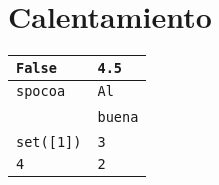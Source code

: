 \section{Calentamiento}
\begin{table}[htbp]
\begin{center}
\begin{tabular}{|l|l|}
\hline
\texttt{False} & \texttt{4.5} \\ \hline
\texttt{spocoa} & \texttt{Al} \\
\  & \texttt{buena} \\ \hline
\texttt{set([1])} & \texttt{3} \\ \hline
\texttt{4} & \texttt{2} \\ \hline
\end{tabular}
\end{center}
\end{table}